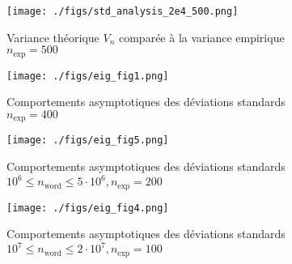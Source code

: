 \begin{frame}
	\begin{figure}
		\centering
		\texttt{[image: ./figs/std\_analysis\_2e4\_500.png]}	
		\captionsetup{justification=centering,margin=2cm}
		\caption{Variance théorique ${V_n}$ comparée à la variance empirique\\
				$n_{\text{exp}} = 500$}
		\label{std_nein}
	\end{figure} 
\end{frame}

\begin{frame}
	\begin{figure}
		\centering
		\texttt{[image: ./figs/eig\_fig1.png]}	
		\captionsetup{justification=centering,margin=2cm}
		\caption{Comportements asymptotiques des déviations standards\\
					$n_{\text{exp}} = 400$}
	\end{figure}
\end{frame}

\begin{frame}
	\begin{figure}[H]
		\centering
		\texttt{[image: ./figs/eig\_fig5.png]}	
		\captionsetup{justification=centering,margin=2cm}
		\caption{Comportements asymptotiques des déviations standards\\
				$10^6 \leq n_{\text{word}} \leq 5\cdot 10^6, n_{\text{exp}}=200$}
	\end{figure}
\end{frame}


\begin{frame}
\begin{figure}[H]
		\centering
		\texttt{[image: ./figs/eig\_fig4.png]}	
		\captionsetup{justification=centering,margin=2cm}
		\caption{Comportements asymptotiques des déviations standards\\
		$10^7 \leq n_{\text{word}} \leq 2\cdot10^7, n_{\text{exp}}=100$}
	\end{figure}
\end{frame}


